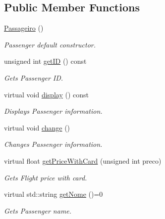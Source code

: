 \subsection*{Public Member Functions}
\begin{DoxyCompactItemize}
\item 
\mbox{\label{class_passageiro_af094ae0224f9b9907e81ad6eef45dd1d}} 
\hyperlink{class_passageiro_af094ae0224f9b9907e81ad6eef45dd1d}{Passageiro} ()
\begin{DoxyCompactList}\small\item\em Passenger default constructor. \end{DoxyCompactList}\item 
unsigned int \hyperlink{class_passageiro_aaca598f3dba0c8a4457ac2f222e84c81}{get\+ID} () const
\begin{DoxyCompactList}\small\item\em Gets Passenger ID. \end{DoxyCompactList}\item 
\mbox{\label{class_passageiro_ad2198f1aa59f29deda7801509494bf72}} 
virtual void \hyperlink{class_passageiro_ad2198f1aa59f29deda7801509494bf72}{display} () const
\begin{DoxyCompactList}\small\item\em Displays Passenger information. \end{DoxyCompactList}\item 
virtual void \hyperlink{class_passageiro_acfec9100c1a2a5b7cdf218f2eb4ea62e}{change} ()
\begin{DoxyCompactList}\small\item\em Changes Passenger information. \end{DoxyCompactList}\item 
virtual float \hyperlink{class_passageiro_ad2477f9716b82c3ffbcdfca5bb776679}{get\+Price\+With\+Card} (unsigned int preco)
\begin{DoxyCompactList}\small\item\em Gets Flight price with card. \end{DoxyCompactList}\item 
virtual std\+::string \hyperlink{class_passageiro_a1871c2ce0cc1254ffc665a415ec7a815}{get\+Nome} ()=0
\begin{DoxyCompactList}\small\item\em Gets Passenger name. \end{DoxyCompactList}\item 

\end{DoxyCompactItemize}
